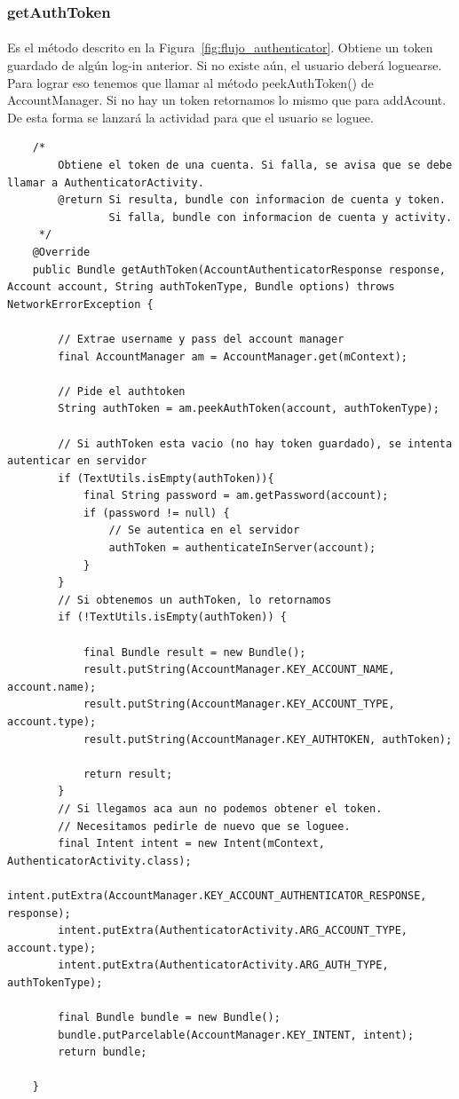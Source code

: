 \documentclass[10pt]{extarticle}
\begin{document}
\subsubsection{getAuthToken}

\paragraph{}
Es el método descrito en la Figura~\ref{fig:flujo_authenticator}. Obtiene un token guardado de algún log-in anterior. Si no existe aún, el usuario deberá loguearse. Para lograr eso tenemos que llamar al método peekAuthToken() de AccountManager. Si no hay un token retornamos lo mismo que para addAcount. De esta forma se lanzará la actividad para que el usuario se loguee.

\begin{lstlisting}
    /*
        Obtiene el token de una cuenta. Si falla, se avisa que se debe llamar a AuthenticatorActivity.
        @return Si resulta, bundle con informacion de cuenta y token.
                Si falla, bundle con informacion de cuenta y activity.
     */
    @Override
    public Bundle getAuthToken(AccountAuthenticatorResponse response, Account account, String authTokenType, Bundle options) throws NetworkErrorException {

        // Extrae username y pass del account manager
        final AccountManager am = AccountManager.get(mContext);

        // Pide el authtoken
        String authToken = am.peekAuthToken(account, authTokenType);

        // Si authToken esta vacio (no hay token guardado), se intenta autenticar en servidor
        if (TextUtils.isEmpty(authToken)){
            final String password = am.getPassword(account);
            if (password != null) {
                // Se autentica en el servidor
                authToken = authenticateInServer(account);
            }
        }
        // Si obtenemos un authToken, lo retornamos
        if (!TextUtils.isEmpty(authToken)) {
            
            final Bundle result = new Bundle();
            result.putString(AccountManager.KEY_ACCOUNT_NAME, account.name);
            result.putString(AccountManager.KEY_ACCOUNT_TYPE, account.type);
            result.putString(AccountManager.KEY_AUTHTOKEN, authToken);
            
            return result;
        }
        // Si llegamos aca aun no podemos obtener el token.
        // Necesitamos pedirle de nuevo que se loguee.
        final Intent intent = new Intent(mContext, AuthenticatorActivity.class);
        intent.putExtra(AccountManager.KEY_ACCOUNT_AUTHENTICATOR_RESPONSE, response);
        intent.putExtra(AuthenticatorActivity.ARG_ACCOUNT_TYPE, account.type);
        intent.putExtra(AuthenticatorActivity.ARG_AUTH_TYPE, authTokenType);
        
        final Bundle bundle = new Bundle();
        bundle.putParcelable(AccountManager.KEY_INTENT, intent);
        return bundle;

    }
\end{lstlisting}
\end{document}
